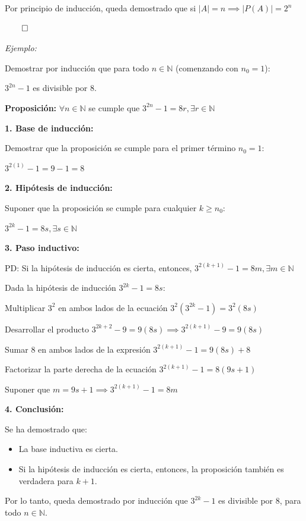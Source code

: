 \documentclass{article}
\begin{document}
Por principio de inducción, queda demostrado que si $\left|A\right| = n \implies \left|P(A)\right| = 2^n$

$\qed$

\textit{Ejemplo:}

Demostrar por inducción que para todo $n \in \mathbb{N}$ (comenzando con $n_0 = 1$):

$3^{2n} - 1$ es divisible por $8$.

\textbf{Proposición:} $\forall n \in \mathbb{N}$ se cumple que $3^{2n} - 1 = 8r, \exists r \in \mathbb{N}$

\textbf{1. Base de inducción:}

Demostrar que la proposición se cumple para el primer término $n_0 = 1$:

$3^{2(1)} - 1 = 9 - 1 = 8$

\textbf{2. Hipótesis de inducción:}

Suponer que la proposición se cumple para cualquier $k \ge n_0$:

$3^{2k} - 1 = 8s, \exists s \in \mathbb{N}$

\textbf{3. Paso inductivo:}

PD: Si la hipótesis de inducción es cierta, entonces, $3^{2(k + 1)} - 1 = 8m, \exists m \in \mathbb{N}$

Dada la hipótesis de inducción $3^{2k} - 1 = 8s$:

Multiplicar $3^2$ en ambos lados de la ecuación $3^2(3^{2k} - 1) = 3^2(8s)$

Desarrollar el producto $3^{2k + 2} - 9 = 9(8s) \implies 3^{2(k + 1)} - 9 = 9(8s)$

Sumar $8$ en ambos lados de la expresión $3^{2(k + 1)} - 1 = 9(8s) + 8$

Factorizar la parte derecha de la ecuación $3^{2(k + 1)} - 1 = 8(9s + 1)$

Suponer que $m = 9s + 1 \implies 3^{2(k + 1)} - 1 = 8m$

\textbf{4. Conclusión:}

Se ha demostrado que:

\begin{itemize}
    \item La base inductiva es cierta.
    \item Si la hipótesis de inducción es cierta, entonces, la proposición también es verdadera para $k + 1$.
\end{itemize}

Por lo tanto, queda demostrado por inducción que $3^{2k} - 1$ es divisible por $8$, para todo $n \in \mathbb{N}$.
\end{document}

